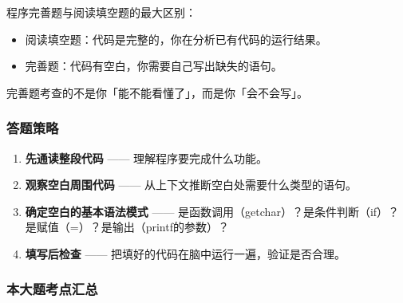 程序完善题与阅读填空题的最大区别：
\begin{itemize}
    \item 阅读填空题：代码是完整的，你在分析已有代码的运行结果。
    \item 完善题：代码有空白，你需要自己写出缺失的语句。
\end{itemize}

完善题考查的不是你「能不能看懂了」，而是你「会不会写」。

\subsubsection{答题策略}

\begin{enumerate}
    \item \textbf{先通读整段代码} —— 理解程序要完成什么功能。
    \item \textbf{观察空白周围代码} —— 从上下文推断空白处需要什么类型的语句。
    \item \textbf{确定空白的基本语法模式} —— 是函数调用（getchar）？是条件判断（if）？是赋值（=）？是输出（printf的参数）？
    \item \textbf{填写后检查} —— 把填好的代码在脑中运行一遍，验证是否合理。
\end{enumerate}

\subsubsection{本大题考点汇总}

